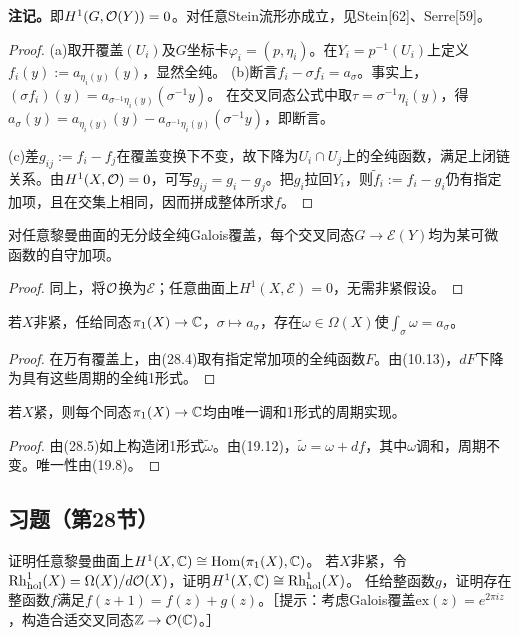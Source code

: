 \textbf{注记。}即$H^1(G,\mathcal O(Y))=0$。对任意Stein流形亦成立，见Stein[62]、Serre[59]。
\begin{proof}
(a)取开覆盖$(U_i)$及$G$坐标卡$\varphi_i=(p,\eta_i)$。在$Y_i=p^{-1}(U_i)$上定义$f_i(y):=a_{\eta_i(y)}(y)$，显然全纯。
(b)断言$f_i-\sigma f_i=a_\sigma$。事实上，$(\sigma f_i)(y)=a_{\sigma^{-1}\eta_i(y)}(\sigma^{-1}y)$。
在交叉同态公式中取$\tau=\sigma^{-1}\eta_i(y)$，得$a_\sigma(y)=a_{\eta_i(y)}(y)-a_{\sigma^{-1}\eta_i(y)}(\sigma^{-1}y)$，即断言。

(c)差$g_{ij}:=f_i-f_j$在覆盖变换下不变，故下降为$U_i\cap U_j$上的全纯函数，满足上闭链关系。由$H^1(X,\mathcal O)=0$，可写$g_{ij}=g_i-g_j$。把$g_i$拉回$Y_i$，则$\widetilde f_i:=f_i-g_i$仍有指定加项，且在交集上相同，因而拼成整体所求$f$。
\end{proof}
对任意黎曼曲面的无分歧全纯Galois覆盖，每个交叉同态$G\to\mathcal E(Y)$均为某可微函数的自守加项。
\begin{proof}
同上，将$\mathcal O$换为$\mathcal E$；任意曲面上$H^1(X,\mathcal E)=0$，无需非紧假设。
\end{proof}
若$X$非紧，任给同态$\pi_1(X)\to\mathbb C$，$\sigma\mapsto a_\sigma$，存在$\omega\in\Omega(X)$使$\int_\sigma\omega=a_\sigma$。
\begin{proof}
在万有覆盖上，由(28.4)取有指定常加项的全纯函数$F$。由(10.13)，$dF$下降为具有这些周期的全纯1形式。
\end{proof}
若$X$紧，则每个同态$\pi_1(X)\to\mathbb C$均由唯一调和1形式的周期实现。
\begin{proof}
由(28.5)如上构造闭1形式$\widetilde\omega$。由(19.12)，$\widetilde\omega=\omega+df$，其中$\omega$调和，周期不变。唯一性由(19.8)。
\end{proof}
\subsection*{习题（第28节）}
证明任意黎曼曲面上$H^1(X,\mathbb C)\cong\operatorname{Hom}(\pi_1(X),\mathbb C)$。
若$X$非紧，令$\operatorname{Rh}_{\mathrm{hol}}^1(X)=\Omega(X)/d\mathcal O(X)$，证明$H^1(X,\mathbb C)\cong\operatorname{Rh}_{\mathrm{hol}}^1(X)$。
任给整函数$g$，证明存在整函数$f$满足$f(z+1)=f(z)+g(z)$。［提示：考虑Galois覆盖$\mathrm{ex}(z)=e^{2\pi iz}$，构造合适交叉同态$\mathbb Z\to\mathcal O(\mathbb C)$。］
